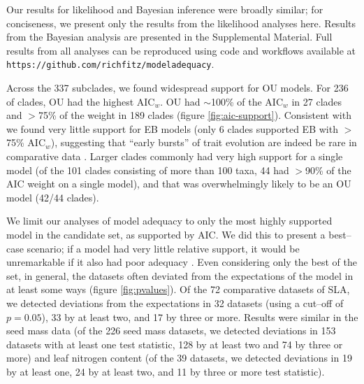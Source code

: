 \documentclass[a4paper,11pt]{article}
\begin{document}
{Our results for likelihood and Bayesian inference were broadly similar; for conciseness, we present only the results from the likelihood analyses here. Results from the Bayesian analysis are presented in the Supplemental Material. Full results from all analyses can be reproduced using code and workflows available at \texttt{https://github.com/richfitz/modeladequacy}. 

Across the 337 subclades, we found widespread support for OU
models. For 236 of clades, OU had the highest AIC$_w$.
OU had $\sim$100\% of the AIC$_w$ in 27 clades and $>$75\% of the weight in 189 clades (figure \ref{fig:aic-support}). Consistent with \citet{Harmon2010} we found very little support for EB models (only 6 clades supported EB with $>$75\% AIC$_w$), suggesting that ``early bursts'' of trait evolution are indeed be rare in comparative data \citep[but see][]{SlaterPennell}. Larger clades commonly had
very high support for a single model (of the 101 clades consisting of more than 100 taxa, 44 had $>$90\% of the AIC weight on a single model),
and that was overwhelmingly likely to be an OU model (42/44 clades). 

We limit our analyses of model adequacy to only the most highly supported model in the candidate set, as supported by AIC. We did this to present a best--case scenario; if a model had very little relative support, it would be unremarkable if it also had poor adequacy \citep[but see][]{Ripplinger2010}. Even considering only the best of the set, in general, the datasets often deviated from the expectations of the model in at least some ways (figure \ref{fig:pvalues}). 
Of the 72 comparative datasets of SLA, we detected deviations from the expectations in 32 datasets (using a cut--off of $p= 0.05$), 33 by at least two, and 17 by three or more. 
Results were similar in the seed mass data (of the 226 seed mass datasets, we detected deviations in 153 datasets with at least one test statistic, 128 by at least two and 74 by three or more) and leaf nitrogen content 
(of the 39 datasets, we detected deviations in 19 by at least one, 24 by at least two, and 11 by three or more test statistic). 

}
\end{document}
